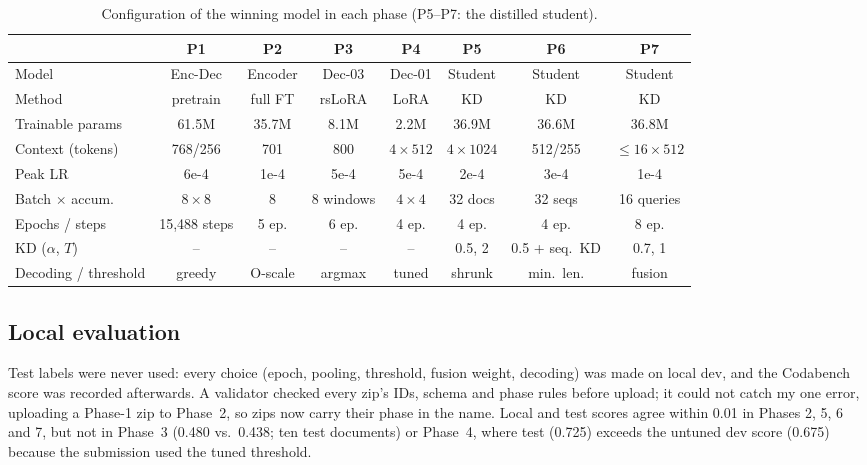 \documentclass[11pt, oneside]{article}
\begin{document}
\begin{table}[t]
\centering
\footnotesize
\caption{Configuration of the winning model in each phase (P5--P7: the distilled student).}
\label{tab:hparams}
\setlength{\tabcolsep}{2.5pt}
\begin{tabular}{lccccccc}
\toprule
 & P1 & P2 & P3 & P4 & P5 & P6 & P7 \\
\midrule
Model & Enc-Dec & Encoder & Dec-03 & Dec-01 & Student & Student & Student \\
Method & pretrain & full FT & rsLoRA & LoRA & KD & KD & KD \\
Trainable params & 61.5M & 35.7M & 8.1M & 2.2M & 36.9M & 36.6M & 36.8M \\
Context (tokens) & 768/256 & 701 & 800 & $4\times512$ & $4\times1024$ & 512/255 & $\le16\times512$ \\
Peak LR & 6e-4 & 1e-4 & 5e-4 & 5e-4 & 2e-4 & 3e-4 & 1e-4 \\
Batch $\times$ accum. & $8\times8$ & 8 & 8 windows & $4\times4$ & 32 docs & 32 seqs & 16 queries \\
Epochs / steps & 15,488 steps & 5 ep. & 6 ep. & 4 ep. & 4 ep. & 4 ep. & 8 ep. \\
KD ($\alpha$, $T$) & -- & -- & -- & -- & 0.5, 2 & 0.5 + seq.\ KD & 0.7, 1 \\
Decoding / threshold & greedy & O-scale & argmax & tuned & shrunk & min.\ len. & fusion \\
\bottomrule
\end{tabular}
\end{table}

\subsection{Local evaluation}
\vspace{-5pt}
Test labels were never used: every choice (epoch, pooling, threshold, fusion weight, decoding) was made on local dev, and the Codabench score was recorded afterwards. A validator checked every zip's IDs, schema and phase rules before upload; it could not catch my one error, uploading a Phase-1 zip to Phase~2, so zips now carry their phase in the name. Local and test scores agree within 0.01 in Phases 2, 5, 6 and 7, but not in Phase~3 (0.480 vs.\ 0.438; ten test documents) or Phase~4, where test (0.725) exceeds the untuned dev score (0.675) because the submission used the tuned threshold.
\end{document}
